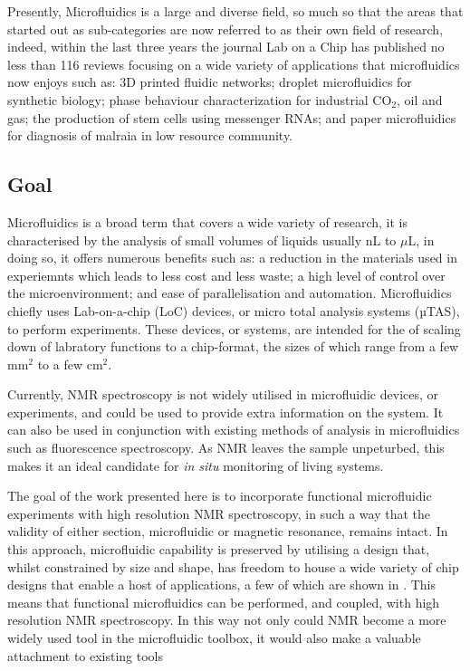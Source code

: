 Presently, Microfluidics is a large and diverse field, so much so that the areas that started out as sub-categories are now referred to as their
own field of research, indeed, within the last three years the journal Lab on a Chip has published no less than 116 reviews focusing on a wide variety of applications
that microfluidics now enjoys such as: 3D printed fluidic networks\citep{kinstlinger20163d}; droplet microfluidics for synthetic biology\citep{gach2017droplet};
phase behaviour characterization for industrial CO$_2$, oil and gas\citep{bao2017microfluidic}; the production of stem cells using messenger RNAs\citep{giulitti2019direct};
and paper microfluidics for diagnosis of malraia in low resource community\citep{reboud2019based}.


\subsection{Goal}

Microfluidics is a broad term that covers a wide variety of research, it is characterised by
the analysis of small volumes of liquids usually nL to $\mu$L, in doing so, it offers numerous benefits
such as: a reduction in the materials used in experiemnts which leads to less cost and less waste; a high
level of control over the microenvironment; and ease of parallelisation and automation.
Microfluidics chiefly uses Lab-on-a-chip (LoC) devices, or micro total analysis
systems (µTAS), to perform experiments. These devices, or systems, are intended for the of scaling down of
labratory functions to a chip-format, the sizes of which range from a few mm$^2$ to a few cm$^2$.

Currently, NMR spectroscopy is not widely utilised in microfluidic devices, or experiments, and could be
used to provide extra information on the system. It can also be used in conjunction with existing methods
of analysis in microfluidics such as fluorescence spectroscopy.
As NMR leaves the sample unpeturbed, this makes it an ideal candidate for \textit{in situ} monitoring of
living systems.

The goal of the work presented here is to incorporate functional microfluidic experiments with high
resolution NMR spectroscopy, in such a way that the validity of either section, microfluidic or magnetic
resonance, remains intact. In this approach, microfluidic capability is preserved by utilising a design
that, whilst constrained by size and shape, has freedom to house a wide variety of chip designs that enable
a host of applications, a few of which are shown in . This means that functional
microfluidics can be performed, and coupled, with high resolution NMR spectroscopy. In this way not only
could NMR become a more widely used tool in the microfluidic toolbox, it would also make a valuable
attachment to existing tools


